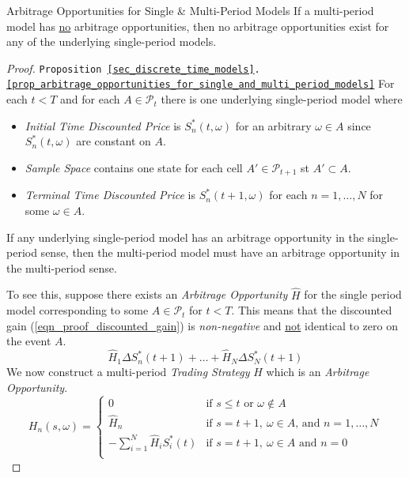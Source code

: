\documentclass[11pt,a4paper]{article}
\begin{document}
  \begin{proposition}{Arbitrage Opportunities for Single \& Multi-Period Models}\label{prop_arbitrage_opportunities_for_single_and_multi_period_models}
    If a multi-period model has \underline{no} arbitrage opportunities, then no arbitrage opportunities exist for any of the underlying single-period models.
  \end{proposition}

  \begin{proof}{\texttt{Proposition \ref{sec_discrete_time_models}.\ref{prop_arbitrage_opportunities_for_single_and_multi_period_models}}}
    For each $t<T$ and for each $A\in\mathcal{P}_t$ there is one underlying single-period model where
    \begin{itemize}
      \item \textit{Initial Time Discounted Price} is $S_n^*(t,\omega)$ for an arbitrary $\omega\in A$ since $S_n^*(t,\omega)$ are constant on $A$.
      \item \textit{Sample Space} contains one state for each cell $A'\in\mathcal{P}_{t+1}$ st $A'\subset A$.
      \item \textit{Terminal Time Discounted Price} is $S_n^*(t+1,\omega)$ for each $n=1,\dots,N$ for some $\omega\in A$.
    \end{itemize}
    If any underlying single-period model has an arbitrage opportunity in the single-period sense, then the multi-period model must have an arbitrage opportunity in the multi-period sense.
    \par To see this, suppose there exists an \textit{Arbitrage Opportunity} $\hat{H}$ for the single period model corresponding to some $A\in\mathcal{P}_t$ for $t<T$. This means that the discounted gain (\ref{eqn_proof_discounted_gain}) is \textit{non-negative} and \underline{not} identical to zero on the event $A$.
    \begin{equation}\label{eqn_proof_discounted_gain}
      \hat{H}_1\Delta S_n^*(t+1)+\dots+\hat{H}_N\Delta S_N^*(t+1)
    \end{equation}
    We now construct a multi-period \textit{Trading Strategy} $H$ which is an \textit{Arbitrage Opportunity}.
    \[ H_n(s,\omega)=\begin{cases}
      0&\text{if }s\leq t\text{ or }\omega\not\in A\\
      \hat{H}_n&\text{if }s=t+1,\ \omega\in A\text{, and }n=1,\dots,N\\
      -\sum_{i=1}^N\hat{H}_iS_i^*(t)&\text{if }s=t+1,\ \omega\in A\text{ and }n=0\\

\end{cases}\]
\end{proof}
\end{document}
